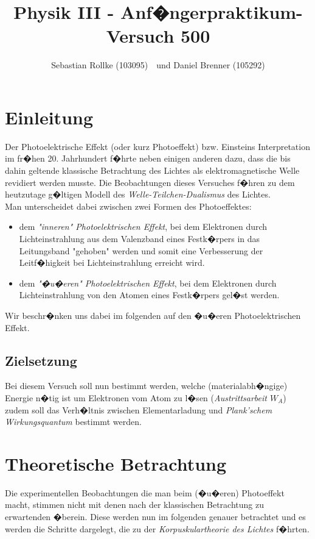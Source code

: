 \documentclass[a4paper, 10pt]{report}%
\author{Sebastian Rollke (103095) \,\, und Daniel Brenner (105292)}
\title{Physik III - Anf�ngerpraktikum- Versuch 500}
\begin{document}
	\maketitle
	\tableofcontents

\chapter{Einleitung}
Der Photoelektrische Effekt (oder kurz Photoeffekt) bzw. Einsteins Interpretation im fr�hen 20. Jahrhundert f�hrte neben einigen anderen dazu, dass die bis dahin geltende klassische Betrachtung des Lichtes als elektromagnetische Welle revidiert werden musste. Die Beobachtungen dieses Versuches f�hren zu dem heutzutage g�ltigen Modell des \textit{Welle-Teilchen-Dualismus} des Lichtes.\\
Man unterscheidet dabei zwischen zwei Formen des Photoeffektes:
\begin{itemize}
	\item dem \textit{"inneren" Photoelektrischen Effekt}, bei dem Elektronen durch Lichteinstrahlung aus dem Valenzband eines Festk�rpers in das Leitungsband "gehoben" werden und somit eine Verbesserung der Leitf�higkeit bei Lichteinstrahlung erreicht wird.
	\item dem \textit{"�u�eren" Photoelektrischen Effekt}, bei dem Elektronen durch Lichteinstrahlung von den Atomen eines Festk�rpers gel�st werden.
\end{itemize}
Wir beschr�nken uns dabei im folgenden auf den �u�eren Photoelektrischen Effekt.
\section{Zielsetzung}
Bei diesem Versuch soll nun bestimmt werden, welche (materialabh�ngige) Energie n�tig ist um Elektronen vom Atom zu l�sen (\textit{Austrittsarbeit $W_A$}) zudem soll das Verh�ltnis zwischen Elementarladung und \textit{Plank'schem Wirkungsquantum} bestimmt werden.\\

\chapter{Theoretische Betrachtung}
Die experimentellen Beobachtungen die man beim (�u�eren) Photoeffekt macht, stimmen nicht mit denen nach der klassischen Betrachtung zu erwartenden �berein. Diese werden nun im folgenden genauer betrachtet und es werden die Schritte dargelegt, die zu der \textit{Korpuskulartheorie des Lichtes} f�hrten.
\end{document}
